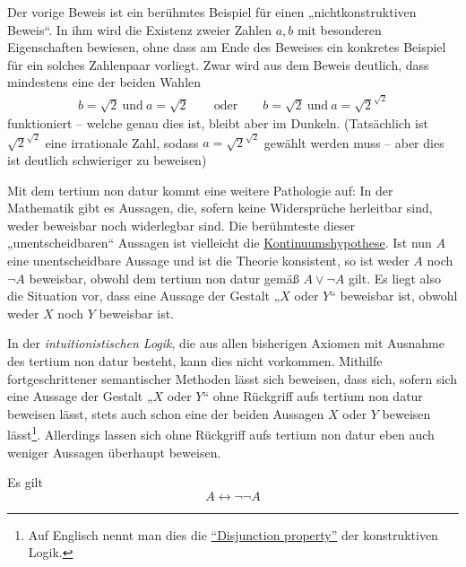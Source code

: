    
\begin{vorschau} \label{nichtkonstruktiv} 
    Der vorige Beweis ist ein berühmtes Beispiel für einen „nichtkonstruktiven Beweis“. In ihm wird die Existenz zweier Zahlen $a,b$ mit besonderen Eigenschaften bewiesen, ohne dass am Ende des Beweises ein konkretes Beispiel für ein solches Zahlenpaar vorliegt. Zwar wird aus dem Beweis deutlich, dass mindestens eine der beiden Wahlen
    \begin{align*}
        b=\sqrt{2}\ \text{und}\ a=\sqrt{2} \qquad \text{oder}\qquad  b=\sqrt{2}\ \text{und}\ a=\sqrt{2}^{\sqrt{2}}
    \end{align*}
    funktioniert -- welche genau dies ist, bleibt aber im Dunkeln. (Tatsächlich ist $\sqrt{2}^{\sqrt{2}}$ eine irrationale Zahl, sodass $a=\sqrt{2}^{\sqrt{2}}$ gewählt werden muss -- aber dies ist deutlich schwieriger zu beweisen)
    
    Mit dem tertium non datur kommt eine weitere Pathologie auf: In der Mathematik gibt es Aussagen, die, sofern keine Widersprüche herleitbar sind, weder beweisbar noch widerlegbar sind. Die berühmteste dieser „unentscheidbaren“ Aussagen ist vielleicht die \href{https://de.wikipedia.org/wiki/Kontinuumshypothese}{Kontinuumshypothese}. Ist nun $A$ eine unentscheidbare Aussage und ist die Theorie konsistent, so ist weder $A$ noch $\neg A$ beweisbar, obwohl dem tertium non datur gemäß $A\lor \neg A$ gilt. Es liegt also die Situation vor, dass eine Aussage der Gestalt „$X$ oder $Y$“ beweisbar ist, obwohl weder $X$ noch $Y$ beweisbar ist.
    
    In der \emph{intuitionistischen Logik}, die aus allen bisherigen Axiomen mit Ausnahme des tertium non datur besteht, kann dies nicht vorkommen. Mithilfe fortgeschrittener semantischer Methoden lässt sich beweisen, dass sich, sofern sich eine Aussage der Gestalt „$X$ oder $Y$“ ohne Rückgriff aufs tertium non datur beweisen lässt, stets auch schon eine der beiden Aussagen $X$ oder $Y$ beweisen lässt\footnote{Auf Englisch nennt man dies die \href{https://en.wikipedia.org/wiki/Disjunction_and_existence_properties}{``Disjunction property''} der konstruktiven Logik.}. Allerdings lassen sich ohne Rückgriff aufs tertium non datur eben auch weniger Aussagen überhaupt beweisen.
\end{vorschau}

   
\begin{satz} \label{doppelneg}
    Es gilt
    \[ A\leftrightarrow \neg \neg A \]
\end{satz}


